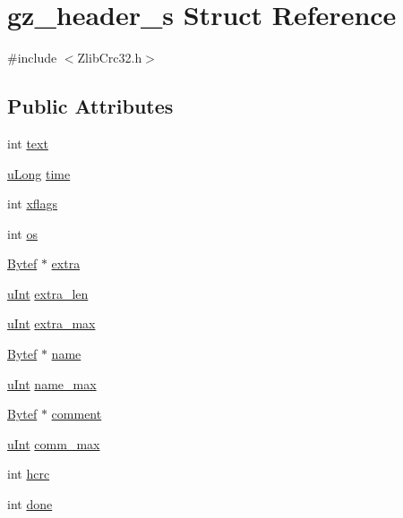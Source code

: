 \hypertarget{structgz__header__s}{}\section{gz\+\_\+header\+\_\+s Struct Reference}
\label{structgz__header__s}


{\ttfamily \#include $<$Zlib\+Crc32.\+h$>$}

\subsection*{Public Attributes}
\begin{DoxyCompactItemize}
\item 
int \mbox{\hyperlink{structgz__header__s_af94c3fadfed835a501bc1babc4b894f9}{text}}
\item 
\mbox{\hyperlink{ZlibCrc32_8h_acd2a5701a3aecf6700d2c66c606ecb40}{u\+Long}} \mbox{\hyperlink{structgz__header__s_a5f00bb6f9689c1abf7a54dad449ce9d3}{time}}
\item 
int \mbox{\hyperlink{structgz__header__s_a40e35dc1a967c6537c6012cf5416210a}{xflags}}
\item 
int \mbox{\hyperlink{structgz__header__s_a2708d3180d30b0563e3c2c965865cd4f}{os}}
\item 
\mbox{\hyperlink{ZlibCrc32_8h_aeb722a888064be47e12d05f692e0f407}{Bytef}} $\ast$ \mbox{\hyperlink{structgz__header__s_a397959afc459da7e296c676a3d4c1915}{extra}}
\item 
\mbox{\hyperlink{ZlibCrc32_8h_a87d141052bcd5ec8a80812a565c70369}{u\+Int}} \mbox{\hyperlink{structgz__header__s_a271798915d64ae1f0d25a3a814ca0aa3}{extra\+\_\+len}}
\item 
\mbox{\hyperlink{ZlibCrc32_8h_a87d141052bcd5ec8a80812a565c70369}{u\+Int}} \mbox{\hyperlink{structgz__header__s_ada4b174bf7ec0442b1091011c7342ca1}{extra\+\_\+max}}
\item 
\mbox{\hyperlink{ZlibCrc32_8h_aeb722a888064be47e12d05f692e0f407}{Bytef}} $\ast$ \mbox{\hyperlink{structgz__header__s_a60ae5eee2882d1c25b3bb328972f0149}{name}}
\item 
\mbox{\hyperlink{ZlibCrc32_8h_a87d141052bcd5ec8a80812a565c70369}{u\+Int}} \mbox{\hyperlink{structgz__header__s_af503d267de15a461b81dcbbfb0d628e5}{name\+\_\+max}}
\item 
\mbox{\hyperlink{ZlibCrc32_8h_aeb722a888064be47e12d05f692e0f407}{Bytef}} $\ast$ \mbox{\hyperlink{structgz__header__s_a1d4fd0807e838ce4bfde54aa021e18e9}{comment}}
\item 
\mbox{\hyperlink{ZlibCrc32_8h_a87d141052bcd5ec8a80812a565c70369}{u\+Int}} \mbox{\hyperlink{structgz__header__s_aa0529f45e5c08b3009cfc2a61a86aea0}{comm\+\_\+max}}
\item 
int \mbox{\hyperlink{structgz__header__s_a29fa8de3acff8d8c7bad61dc924d8564}{hcrc}}
\item 
int \mbox{\hyperlink{structgz__header__s_ab8fd11f59b76a7d031e24bede8679d9d}{done}}
\end{DoxyCompactItemize}


